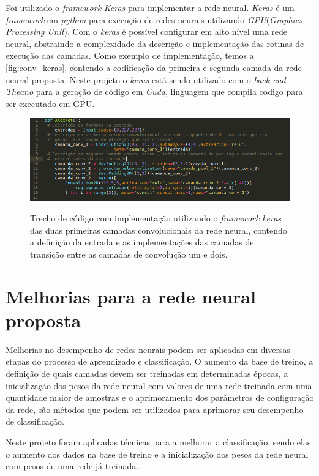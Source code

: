 \par Foi utilizado o \textit{framework} \textit{Keras} \cite{chollet2015keras} para implementar a rede neural. \textit{Keras} é um \textit{framework} em \textit{python} para execução de redes neurais utilizando \textit{GPU}(\textit{Graphics Processing Unit}). Com o \textit{keras} é possível configurar em alto nível uma rede neural, abstraindo a complexidade da descrição e implementação das rotinas de execução das camadas. Como exemplo de implementação, temos a \autoref{fig:conv_keras}, contendo a codificação da primeira e segunda camada da rede neural proposta. Neste projeto o \textit{keras} está sendo utilizado com o \textit{back end Theano} \cite{2016arXiv160502688full} para a geração de código em \textit{Cuda}, linguagem que compila codigo para ser executado em GPU.
\begin{figure}[H]
  \centering
  \caption{Trecho de código com implementação utilizando o \textit{framework} \textit{keras} das duas primeiras camadas convolucionais da rede neural, contendo a definição da entrada e as implementações das camadas de transição entre as camadas de convolução um e dois.}
  \includegraphics[width=400pt]{dados/figuras/exemplo_keras}
  \label{fig:conv_keras}
\end{figure}


\section{Melhorias para a rede neural proposta}

Melhorias no desempenho de redes neurais podem ser aplicadas em diversas etapas do processo de aprendizado e classificação. O aumento da base de treino, a definição de quais camadas devem ser treinadas em determinadas épocas, a inicialização dos pesos da rede neural com valores de uma rede treinada com uma quantidade maior de amostras e o aprimoramento dos parâmetros de configuração da rede, são métodos que podem ser utilizados para aprimorar seu desempenho de classificação.

\par Neste projeto foram aplicadas técnicas para a melhorar a classificação, sendo elas
o aumento dos dados na base de treino e a inicialização dos pesos da rede neural com pesos de uma rede já treinada. %

